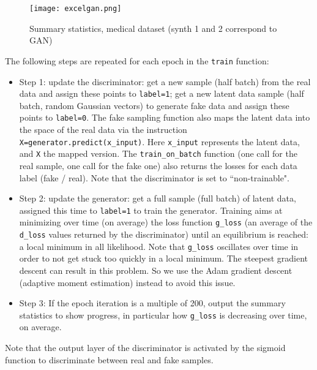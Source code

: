 \documentclass[oneside,10pt]{book}
\begin{document}
\begin{figure}[H]
\centering
\texttt{[image: excelgan.png]}  
\caption{Summary statistics, medical dataset (synth 1 and 2 correspond to GAN)}
\label{fig:pictty2xkuu}
\end{figure}

\noindent The following steps are repeated for each epoch in the \texttt{train} function: \vspace{1ex}\nopagebreak

\begin{itemize}\nopagebreak
\item Step 1: update the discriminator: get a new sample (half batch) from the real data and assign these points to \texttt{label=1}; get a new latent data sample (half batch, random Gaussian vectors) to generate fake data and assign these points to \texttt{label=0}. The fake sampling function also maps the latent data  into the space of the real data via the instruction \texttt{X=generator.predict(x\_input)}. Here \texttt{x\_input} represents the latent data, and
 \texttt{X} the mapped version. The \texttt{train\_on\_batch} function (one call for the real sample, one call for the fake one) also returns the losses for each  data label (fake / real). Note that the discriminator is set to ``non-trainable". 
\item Step 2: update the generator: get a full sample (full batch) of latent data, assigned this time to \texttt{label=1} to train the generator. 
Training aims at minimizing over time (on average) the loss function
 \texttt{g\_loss} (an average of the \texttt{d\_loss} values returned by the discriminator) until an equilibrium is reached: a local minimum in all likelihood. 
Note that \texttt{g\_loss} oscillates over time in order to not get stuck too quickly in a local minimum. The steepest gradient descent can result in this problem. So we use the \textcolor{index}{Adam gradient descent} (adaptive moment estimation) instead to avoid this issue. 
\item Step 3:  If the epoch iteration is a multiple of 200, output the summary statistics to show progress, in particular how 
 \texttt{g\_loss} is decreasing over time, on average. 
\end{itemize}\vspace{1ex}

\noindent Note that the output layer of the discriminator is activated by the sigmoid function  to discriminate between real and fake samples.
\end{document}
